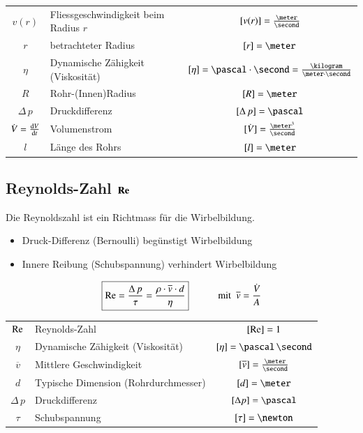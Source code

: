 \renewcommand{\arraystretch}{1.3}
\begin{tabular}{c l c}
    $v(r)$                              & Fliessgeschwindigkeit beim Radius $r$ & $[v(r)] = \frac{\meter}{\second}$         \\
    
$r$                                 & betrachteter Radius                   & $[r] = \meter$                            \\
    $\eta$           
                               & Dynamische Zähigkeit (Viskosität)     & $[\eta] = \pascal \cdot \second = \frac{\kilogram}{\meter \cdot \second}$             \\
    $R$                                 & Rohr-(Innen)Radius             
       & $[R] = \meter$                            \\
    $\Delta \, p$                       & Druckdifferenz                        & $[\Delta \, p] = \pascal$   
              \\
    $\dot{V} = \frac{\mathop{} \! \mathrm{d} V}{\mathop{} \! \mathrm{d} t}$ &  Volumenstrom                         & $[\dot{V}] = \frac{\meter^3}{\second}$	\\
    $l$                                 & Länge des Rohrs       
                & $[l] = \meter$
\end{tabular}
\renewcommand{\arraystretch}{1}

\subsection[Reynolds-Zahl]{Reynolds-Zahl $\bm{\mathop{} \! \mathrm{Re}}$}

Die Reynoldszahl ist ein Richtmass für die Wirbelbildung. \smallskip
\begin{itemize}
    \item Druck-Differenz (Bernoulli) begünstigt Wirbelbildung
    \item Innere Reibung (Schubspannung) verhindert Wirbelbildung 
\end{itemize}

\[\boxed{ \mathop{} \! \mathrm{Re} = \frac{\Delta \, p}{\tau} = \frac{\rho \cdot \overline{v} \cdot d}{\eta}} \qquad \quad \text{mit } \; \overline{v} = \frac{\dot{V}}{A} \]


\begin{tabular}{c l c}
    $\mathop{} \! \mathrm{Re}$          & Reynolds-Zahl                         & $[\mathop{} \! \mathrm{Re}] = 1$                              \\
    $\eta$          & Dynamische Zähigkeit (Viskosität)     
& $[\eta] = \pascal \, \second$             \\
    $\overline{v}$  & Mittlere Geschwindigkeit              & $[\overline{v}] = \frac{\meter}{\second}$ \\
    $d$             & Typische Dimension (Rohrdurchmesser)  & $[d] = \meter$                            \\
   
 $\Delta \, p$   & Druckdifferenz                        & $[\Delta p] = \pascal$                    \\
    $\tau$          & Schubspannung                         & $[\tau] = \newton$
\end{tabular}

